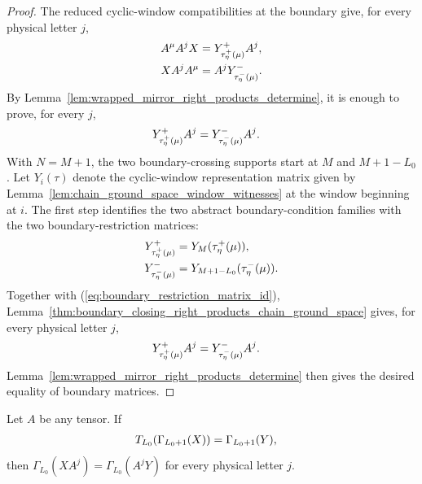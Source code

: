 \begin{proof}
    \leanok
    The reduced cyclic-window compatibilities at the boundary give, for every
    physical letter $j$,
    \begin{align}
        A^{\mu} A^j X
         & =
        Y^{+}_{\tau^{+}_{\eta}(\mu)} A^j,
        \notag \\
        X A^j A^{\mu}
         & =
        A^j Y^{-}_{\tau^{-}_{\eta}(\mu)}.
        \notag
    \end{align}
    By Lemma~\ref{lem:wrapped_mirror_right_products_determine}, it is enough to
    prove, for every $j$,
    \begin{align}
        Y^{+}_{\tau^{+}_{\eta}(\mu)} A^j
         & =
        Y^{-}_{\tau^{-}_{\eta}(\mu)} A^j.
        \notag
    \end{align}
    With $N=M+1$, the two boundary-crossing supports start at $M$ and
    $M+1-L_0$. Let $Y_i(\tau)$ denote the cyclic-window representation matrix
    given by Lemma~\ref{lem:chain_ground_space_window_witnesses} at the window
    beginning at $i$. The first step identifies the two abstract
    boundary-condition families with the two boundary-restriction matrices:
    \begin{align}
        Y^{+}_{\tau^{+}_{\eta}(\mu)}
         & =
        Y_M(\tau^{+}_{\eta}(\mu)),
        \notag \\
        Y^{-}_{\tau^{-}_{\eta}(\mu)}
         & =
        Y_{M+1-L_0}(\tau^{-}_{\eta}(\mu)).
        \label{eq:boundary_restriction_matrix_id}
    \end{align}
    Together with (\ref{eq:boundary_restriction_matrix_id}),
    Lemma~\ref{thm:boundary_closing_right_products_chain_ground_space}
    gives, for every physical letter $j$,
    \begin{align}
        Y^{+}_{\tau^{+}_{\eta}(\mu)} A^j
         & =
        Y^{-}_{\tau^{-}_{\eta}(\mu)} A^j.
        \notag
    \end{align}
    Lemma~\ref{lem:wrapped_mirror_right_products_determine} then gives the
    desired equality of boundary matrices.
\end{proof}

\begin{lemma}
    \label{thm:full_ring_boundary_change_of_cut}
    \leanok
    Let $A$ be any tensor. If
    \begin{align}
        T_{L_0}\!\left(\Gamma_{L_0+1}(X)\right)
         & =\Gamma_{L_0+1}(Y),
        \notag
    \end{align}
    then $\Gamma_{L_0}(XA^j)=\Gamma_{L_0}(A^jY)$ for every physical letter $j$.
\end{lemma}

